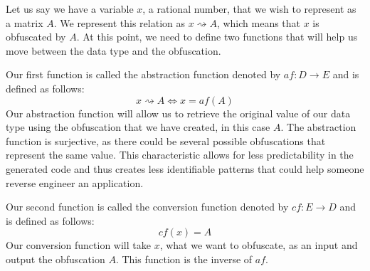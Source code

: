Let us say we have a variable $ x $, a rational number, that we wish to
represent as a matrix $ A $. We represent this relation as $ x \rightsquigarrow
A $, which means that $ x $ is obfuscated by $ A $. At this point, we need to
define two functions that will help us move between the data type and the
obfuscation.

Our first function is called the abstraction function denoted by $ af: D \to E
$ and is
defined as follows:
\begin{equation*}
    x \rightsquigarrow A \Leftrightarrow x = af (A)
\end{equation*}
Our abstraction function will allow us to retrieve the original value of our
data type using the obfuscation that we have created, in this case $ A $. The
abstraction function is surjective, as there could be several possible
obfuscations that represent the same value. This characteristic allows for less
predictability in the generated code and thus creates less identifiable
patterns that could help someone reverse engineer an application.

Our second function is called the conversion function denoted by $ cf: E \to D
$ and is defined as follows:
\begin{equation*}
    cf (x) = A
\end{equation*}
Our conversion function will take $ x $, what we want to obfuscate, as an input
and output the obfuscation $ A $. This function is the inverse of $ af $.

